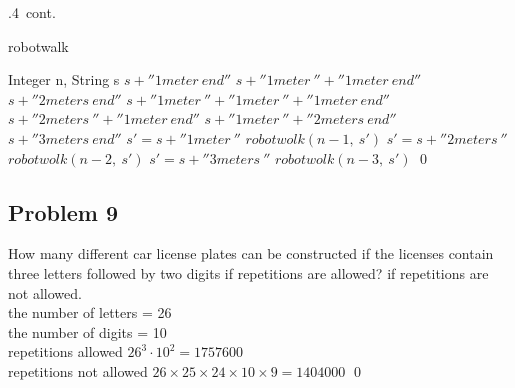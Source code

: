 \documentclass[
               handout,
               ]{beamer}
\begin{document}
        \begin{frame}[c,shrink]{\subsecname.4\ cont.}          
            \begin{algorithm}[H]
                \caption {robotwalk}
                \label{alg4}
                \begin{algorithmic}[1]
                    \REQUIRE Integer n, String s
                    \PRINT $s+''1 meter\ end''$
                    \RETURN
                    \PRINT $s+''1 meter\ ''+''1 meter\ end''$
                    \PRINT $s+''2 meters\ end''$
                    \RETURN
                    \PRINT $s+''1 meter\ ''+''1 meter\ ''+''1 meter\ end''$
                    \PRINT $s+''2 meters\ ''+''1 meter\ end''$
                    \PRINT $s+''1 meter\ ''+''2 meters\ end''$
                    \PRINT $s+''3 meters\ end''$
                    \RETURN
                    \ELSE
                    \STATE $s\prime = s + ''1 meter\ ''$
                    \STATE $robotwolk(n-1,\ s\prime)$
                    \STATE $s\prime = s + ''2 meters\ ''$
                    \STATE $robotwolk(n-2,\ s\prime)$
                    \STATE $s\prime = s + ''3 meters\ ''$
                    \STATE $robotwolk(n-3,\ s\prime)$
                    \ENDIF \qed
                \end{algorithmic}
            \end{algorithm}        
        \end{frame}



    \subsection{Problem 9}
    
        \begin{frame}[c]{\subsecname}
            How many different car license plates can be constructed if the licenses contain three letters followed by two digits if repetitions are allowed? if repetitions are not allowed.\\$\;$\\\pause
            the number of letters = 26\\
            the number of digits = 10\\\pause
            repetitions allowed $26^3\cdot10^2=1757600$\\
            repetitions not allowed $26\times25\times24\times10\times9=1404000$ \qed
        \end{frame}
\end{document}

